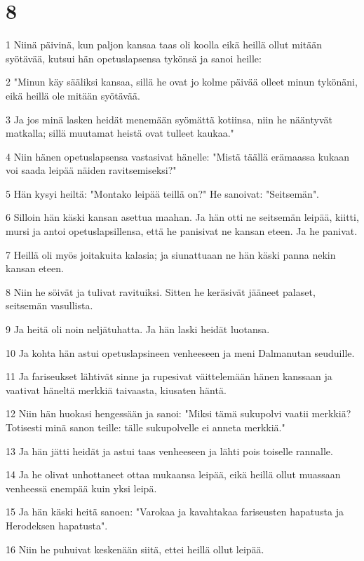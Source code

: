 \chapter{8}

\par 1 Niinä päivinä, kun paljon kansaa taas oli koolla eikä heillä ollut mitään syötävää, kutsui hän opetuslapsensa tykönsä ja sanoi heille:
\par 2 "Minun käy sääliksi kansaa, sillä he ovat jo kolme päivää olleet minun tykönäni, eikä heillä ole mitään syötävää.
\par 3 Ja jos minä lasken heidät menemään syömättä kotiinsa, niin he nääntyvät matkalla; sillä muutamat heistä ovat tulleet kaukaa."
\par 4 Niin hänen opetuslapsensa vastasivat hänelle: "Mistä täällä erämaassa kukaan voi saada leipää näiden ravitsemiseksi?"
\par 5 Hän kysyi heiltä: "Montako leipää teillä on?" He sanoivat: "Seitsemän".
\par 6 Silloin hän käski kansan asettua maahan. Ja hän otti ne seitsemän leipää, kiitti, mursi ja antoi opetuslapsillensa, että he panisivat ne kansan eteen. Ja he panivat.
\par 7 Heillä oli myös joitakuita kalasia; ja siunattuaan ne hän käski panna nekin kansan eteen.
\par 8 Niin he söivät ja tulivat ravituiksi. Sitten he keräsivät jääneet palaset, seitsemän vasullista.
\par 9 Ja heitä oli noin neljätuhatta. Ja hän laski heidät luotansa.
\par 10 Ja kohta hän astui opetuslapsineen venheeseen ja meni Dalmanutan seuduille.
\par 11 Ja fariseukset lähtivät sinne ja rupesivat väittelemään hänen kanssaan ja vaativat häneltä merkkiä taivaasta, kiusaten häntä.
\par 12 Niin hän huokasi hengessään ja sanoi: "Miksi tämä sukupolvi vaatii merkkiä? Totisesti minä sanon teille: tälle sukupolvelle ei anneta merkkiä."
\par 13 Ja hän jätti heidät ja astui taas venheeseen ja lähti pois toiselle rannalle.
\par 14 Ja he olivat unhottaneet ottaa mukaansa leipää, eikä heillä ollut muassaan venheessä enempää kuin yksi leipä.
\par 15 Ja hän käski heitä sanoen: "Varokaa ja kavahtakaa fariseusten hapatusta ja Herodeksen hapatusta".
\par 16 Niin he puhuivat keskenään siitä, ettei heillä ollut leipää.
